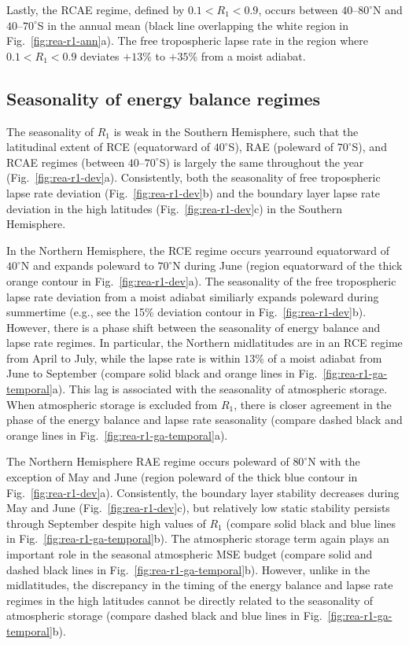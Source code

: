 \documentclass{ametsocV5}
\begin{document}
    Lastly, the RCAE regime, defined by $0.1 < R_1 < 0.9$, occurs between $40$--$80^\circ$N and $40$--$70^\circ$S in the annual mean (black line overlapping the white region in Fig.~\ref{fig:rea-r1-ann}a). The free tropospheric lapse rate in the region where $0.1 < R_1 < 0.9$ deviates $+13$\% to $+35$\% from a moist adiabat.

    \subsection{Seasonality of energy balance regimes} \label{subsec:seasonality}
    The seasonality of $R_1$ is weak in the Southern Hemisphere, such that the latitudinal extent of RCE (equatorward of $40^\circ$S), RAE (poleward of $70^\circ$S), and RCAE regimes (between $40$--$70^\circ$S) is largely the same throughout the year (Fig.~\ref{fig:rea-r1-dev}a). Consistently, both the seasonality of free tropospheric lapse rate deviation (Fig.~\ref{fig:rea-r1-dev}b) and the boundary layer lapse rate deviation in the high latitudes (Fig.~\ref{fig:rea-r1-dev}c)  in the Southern Hemisphere.

    In the Northern Hemisphere, the RCE regime occurs yearround equatorward of $40^\circ$N and expands poleward to $70^\circ$N during June (region equatorward of the thick orange contour in Fig.~\ref{fig:rea-r1-dev}a). The seasonality of the free tropospheric lapse rate deviation from a moist adiabat similiarly expands poleward during summertime (e.g., see the 15\% deviation contour in Fig.~\ref{fig:rea-r1-dev}b). However, there is a phase shift between the seasonality of energy balance and lapse rate regimes. In particular, the Northern midlatitudes are in an RCE regime from April to July, while the lapse rate is within $13$\% of a moist adiabat from June to September (compare solid black and orange lines in Fig.~\ref{fig:rea-r1-ga-temporal}a). This lag is associated with the seasonality of atmospheric storage. When atmospheric storage is excluded from $R_1$, there is closer agreement in the phase of the energy balance and lapse rate seasonality (compare dashed black and orange lines in Fig.~\ref{fig:rea-r1-ga-temporal}a).

    The Northern Hemisphere RAE regime occurs poleward of $80^\circ$N with the exception of May and June (region poleward of the thick blue contour in Fig.~\ref{fig:rea-r1-dev}a). Consistently, the boundary layer stability decreases during May and June (Fig.~\ref{fig:rea-r1-dev}c), but relatively low static stability persists through September despite high values of $R_1$ (compare solid black and blue lines in Fig.~\ref{fig:rea-r1-ga-temporal}b). The atmospheric storage term again plays an important role in the seasonal atmospheric MSE budget (compare solid and dashed black lines in Fig.~\ref{fig:rea-r1-ga-temporal}b). However, unlike in the midlatitudes, the discrepancy in the timing of the energy balance and lapse rate regimes in the high latitudes cannot be directly related to the seasonality of atmospheric storage (compare dashed black and blue lines in Fig.~\ref{fig:rea-r1-ga-temporal}b).
\end{document}
